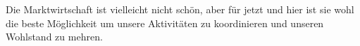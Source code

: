 Die Marktwirtschaft ist vielleicht nicht schön, aber für jetzt und hier ist sie wohl die beste Möglichkeit um unsere Aktivitäten zu koordinieren und unseren Wohlstand zu mehren.